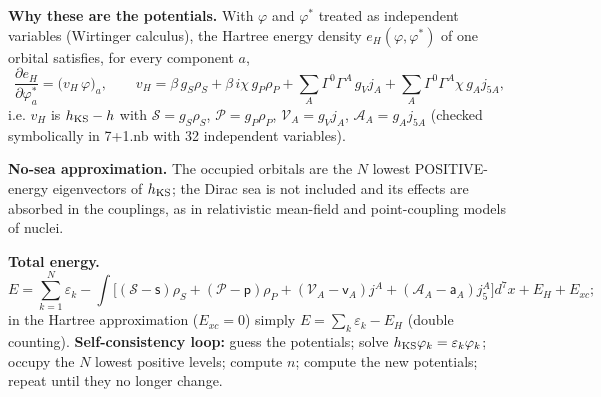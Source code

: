 \documentclass[10pt,a4paper]{article}
\begin{document}
\textbf{Why these are the potentials.} With $\varphi$ and $\varphi^*$ treated as independent variables (Wirtinger calculus), the Hartree energy density $e_H(\varphi,\varphi^*)$ of one orbital satisfies, for every component $a$,
\begin{equation*}
\frac{\partial e_H}{\partial\varphi_a^*}=\big(v_H\,\varphi\big)_a,\qquad v_H=\beta\,g_S\rho_S+\beta\,i\chi\,g_P\rho_P+\sum_A\Gamma^0\Gamma^A\,g_Vj_A+\sum_A\Gamma^0\Gamma^A\chi\,g_Aj_{5A},
\end{equation*}
i.e. $v_H$ is $h_{\rm KS}-h$ with $\mathcal S=g_S\rho_S$, $\mathcal P=g_P\rho_P$, $\mathcal V_A=g_Vj_A$, $\mathcal A_A=g_Aj_{5A}$ (checked symbolically in 7+1.nb with 32 independent variables).

\textbf{No-sea approximation.} The occupied orbitals are the $N$ lowest POSITIVE-energy eigenvectors of $h_{\rm KS}$; the Dirac sea is not included and its effects are absorbed in the couplings, as in relativistic mean-field and point-coupling models of nuclei.

\textbf{Total energy.}
\begin{equation*}
E=\sum_{k=1}^{N}\varepsilon_k-\int\Big[(\mathcal S-\mathsf s)\rho_S+(\mathcal P-\mathsf p)\rho_P+(\mathcal V_A-\mathsf v_A)j^A+(\mathcal A_A-\mathsf a_A)j_5^A\Big]d^7x+E_H+E_{xc};
\end{equation*}
in the Hartree approximation ($E_{xc}=0$) simply $E=\sum_k\varepsilon_k-E_H$ (double counting). \textbf{Self-consistency loop:} guess the potentials; solve $h_{\rm KS}\varphi_k=\varepsilon_k\varphi_k$; occupy the $N$ lowest positive levels; compute $n$; compute the new potentials; repeat until they no longer change.
\end{document}
